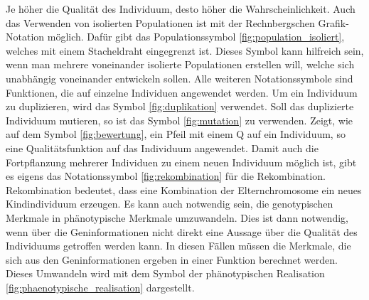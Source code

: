 Je höher die Qualität des Individuum, desto höher die Wahrscheinlichkeit. Auch das Verwenden von isolierten Populationen ist mit der Rechnbergschen Grafik-Notation möglich. Dafür gibt das Populationssymbol \ref{fig:population_isoliert}, welches mit einem Stacheldraht eingegrenzt ist. Dieses Symbol kann hilfreich sein, wenn man mehrere voneinander isolierte Populationen erstellen will, welche sich unabhängig voneinander entwickeln sollen. Alle weiteren Notationssymbole sind Funktionen, die auf einzelne Individuen angewendet werden. Um ein Individuum zu duplizieren, wird das Symbol \ref{fig:duplikation} verwendet. Soll das duplizierte Individuum mutieren, so ist das Symbol \ref{fig:mutation} zu verwenden. Zeigt, wie auf dem Symbol \ref{fig:bewertung}, ein Pfeil mit einem Q auf ein Individuum, so eine Qualitätsfunktion auf das Individuum angewendet. Damit auch die Fortpflanzung mehrerer Individuen zu einem neuen Individuum möglich ist, gibt es eigens das Notationssymbol \ref{fig:rekombination} für die Rekombination. Rekombination bedeutet, dass eine Kombination der Elternchromosome ein neues Kindindividuum erzeugen.
Es kann auch notwendig sein, die genotypischen Merkmale in phänotypische Merkmale umzuwandeln. Dies ist dann notwendig, wenn über die Geninformationen nicht direkt eine Aussage über die Qualität des Individuums getroffen werden kann. In diesen Fällen müssen die Merkmale, die sich aus den Geninformationen ergeben in einer Funktion berechnet werden. Dieses Umwandeln wird mit dem Symbol der phänotypischen Realisation \ref{fig:phaenotypische_realisation} dargestellt.

